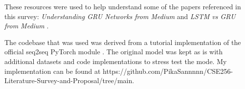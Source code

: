\documentclass[11pt,a4paper]{article}
\begin{document}
These resources were used to help understand some of the papers referenced in this survey: \textit{Understanding GRU Networks from Medium} \cite{Kostadinov_2019} and \textit{LSTM vs GRU from Medium} \cite{Srivatsavaya_2023}.

The codebase that was used was derived from a tutorial implementation of the official seq2seq PyTorch module \cite{github}. The original model was kept as is with additional datasets and code implementations to stress test the mode. My implementation can be found at https://github.com/PikaSannnnn/CSE256-Literature-Survey-and-Proposal/tree/main.





\footnotesize

\end{document}
